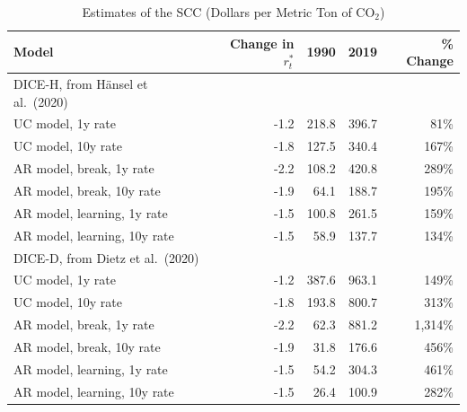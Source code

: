 \begin{table}[!htbp]
\centering
\caption{Estimates of the SCC (Dollars per Metric Ton of CO$_2$)}
\label{tab:scc_estimates}
\begin{threeparttable}
\setlength{\tabcolsep}{6pt}
\begin{tabular}{lrrrr}
\toprule\toprule
Model & Change in $r_t^{*}$ & 1990 & 2019 & \% Change \\
\midrule
DICE-H, from H\"ansel et al.\ (2020) & & & & \\
\hspace{0.75em}UC model, 1y rate & -1.2 & 218.8 & 396.7 & 81\% \\
\hspace{0.75em}UC model, 10y rate & -1.8 & 127.5 & 340.4 & 167\% \\
\hspace{0.75em}AR model, break, 1y rate & -2.2 & 108.2 & 420.8 & 289\% \\
\hspace{0.75em}AR model, break, 10y rate & -1.9 & 64.1 & 188.7 & 195\% \\
\hspace{0.75em}AR model, learning, 1y rate & -1.5 & 100.8 & 261.5 & 159\% \\
\hspace{0.75em}AR model, learning, 10y rate & -1.5 & 58.9 & 137.7 & 134\% \\
\addlinespace[0.35em]
DICE-D, from Dietz et al.\ (2020) & & & & \\
\hspace{0.75em}UC model, 1y rate & -1.2 & 387.6 & 963.1 & 149\% \\
\hspace{0.75em}UC model, 10y rate & -1.8 & 193.8 & 800.7 & 313\% \\
\hspace{0.75em}AR model, break, 1y rate & -2.2 & 62.3 & 881.2 & 1,314\% \\
\hspace{0.75em}AR model, break, 10y rate & -1.9 & 31.8 & 176.6 & 456\% \\
\hspace{0.75em}AR model, learning, 1y rate & -1.5 & 54.2 & 304.3 & 461\% \\
\hspace{0.75em}AR model, learning, 10y rate & -1.5 & 26.4 & 100.9 & 282\% \\
\bottomrule
\end{tabular}
\begin{tablenotes}[flushleft]

\end{tablenotes}
\end{threeparttable}
\end{table}
